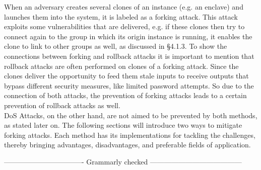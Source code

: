 When an adversary creates several clones of an instance (e.g. an enclave) and launches them into the system, it is labeled as a forking attack. This attack exploits some vulnerabilities that are delivered, e.g. if these clones then try to connect again to the group in which its origin instance is running, it enables the clone to link to other groups as well, as discussed in §4.1.3. 
To show the connections between forking and rollback attacks it is important to mention that rollback attacks are often performed on clones of a forking attack. Since the clones deliver the opportunity to feed them stale inputs to receive outputs that bypass different security measures, like limited password attempts. So due to the connection of both attacks, the prevention of forking attacks leads to a certain prevention of rollback attacks as well. \\

DoS Attacks, on the other hand, are not aimed to be prevented by both methods, as stated later on. The following sections will introduce two ways to mitigate forking attacks. Each method has its implementations for tackling the challenges, thereby bringing advantages, disadvantages, and preferable fields of application.


---------------------------------- Grammarly checked ---------------------------------------



